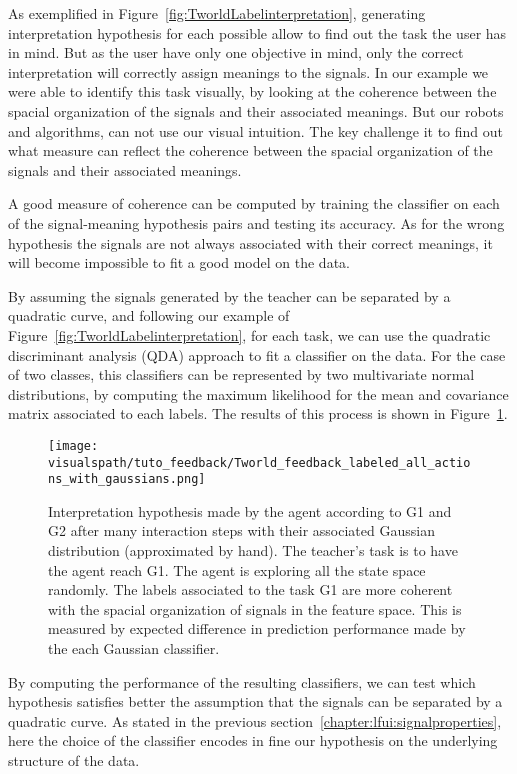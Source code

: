 As exemplified in Figure~\ref{fig:TworldLabelinterpretation}, generating interpretation hypothesis for each possible allow to find out the task the user has in mind. But as the user have only one objective in mind, only the correct interpretation will correctly assign meanings to the signals. In our example we were able to identify this task visually, by looking at the coherence between the spacial organization of the signals and their associated meanings. But our robots and algorithms, can not use our visual intuition. The key challenge it to find out what measure can reflect the coherence between the spacial organization of the signals and their associated meanings.

A good measure of coherence can be computed by training the classifier on each of the signal-meaning hypothesis pairs and testing its accuracy. As for the wrong hypothesis the signals are not always associated with their correct meanings, it will become impossible to fit a good model on the data. 

By assuming the signals generated by the teacher can be separated by a quadratic curve, and following our example of Figure~\ref{fig:TworldLabelinterpretation}, for each task, we can use the  quadratic discriminant analysis (QDA) \cite{lachenbruch1975discriminant} approach to fit a classifier on the data. For the case of two classes, this classifiers can be represented by two multivariate normal distributions, by  computing the maximum likelihood for the mean and covariance matrix associated to each labels. The results of this process is shown in Figure~\ref{fig:TworldLabelGaussian}.

\begin{figure}[!ht]
    \centering
    \texttt{[image: \\visualspath/tuto\_feedback/Tworld\_feedback\_labeled\_all\_actions\_with\_gaussians.png]}
    \caption{Interpretation hypothesis made by the agent according to G1 and G2 after many interaction steps with their associated Gaussian distribution (approximated by hand). The teacher's task is to have the agent reach G1. The agent is exploring all the state space randomly. The labels associated to the task G1 are more coherent with the spacial organization of signals in the feature space. This is measured by expected difference in prediction performance made by the each Gaussian classifier.}
    \label{fig:TworldLabelGaussian}
\end{figure}

By computing the performance of the resulting classifiers, we can test which hypothesis satisfies better the assumption that the signals can be separated by a quadratic curve. As stated in the previous section~\ref{chapter:lfui:signalproperties}, here the choice of the classifier encodes in fine our hypothesis on the underlying structure of the data.

